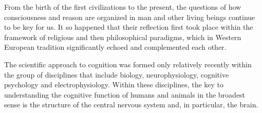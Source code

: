 


{\actuality}

From the birth of the first civilizations to the present, the questions of how
consciousness and reason are organized in man and other living beings continue
to be key for us.  It so happened that their reflection first took place within
the framework of religious and then philosophical paradigms, which in Western
European tradition significantly echoed and complemented each other.

The scientific approach to cognition was formed only relatively recently within
the group of disciplines that include biology, neurophysiology, cognitive
psychology and electrophysiology. Within these disciplines, the key to
understanding the cognitive function of humans and animals in the broadest
sense is the structure of the central nervous system and, in particular, the
brain.


